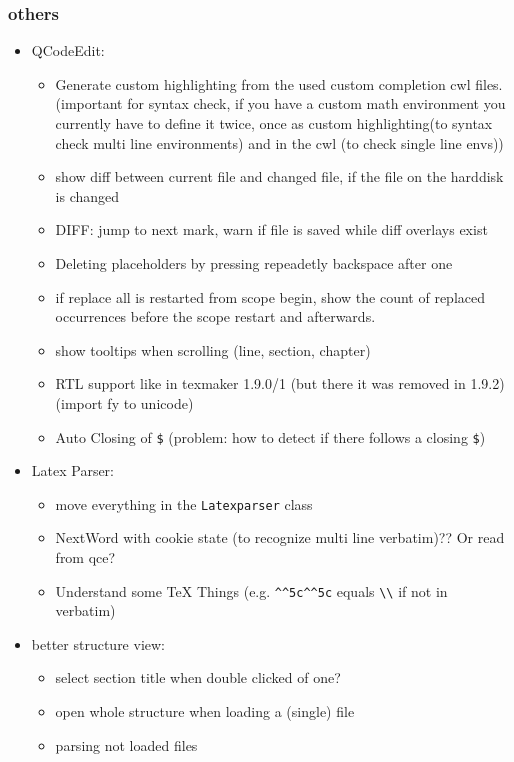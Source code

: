 \documentclass[10pt,a4paper,landscape]{report}
\begin{document}
\subsubsection{others}
\begin{itemize}
	\item QCodeEdit: \begin{itemize}
		\item Generate custom highlighting from the used custom completion cwl files. (important for syntax check, if you have a custom math environment you currently have to define it twice, once as custom highlighting(to syntax check multi line environments) and in the cwl (to check single line envs))
		\item show diff between current file and changed file, if the file on the harddisk is changed
		\item DIFF: jump to next mark, warn if file is saved while diff overlays exist
		\item Deleting placeholders by pressing repeadetly backspace after one
		\item if replace all is restarted from scope begin, show the count of replaced occurrences before the scope restart and afterwards.
		\item show tooltips when scrolling (line, section, chapter)
		\item RTL support like in texmaker 1.9.0/1 (but there it was removed in 1.9.2) (import fy to unicode)
		\item Auto Closing of \verb+$+ (problem: how to detect if there follows a closing \verb+$+)
	\end{itemize}
	\item Latex Parser: \begin{itemize}
		\item move everything in the \verb+Latexparser+ class
		\item NextWord with cookie state (to recognize multi line verbatim)?? Or read from qce?
		\item Understand some TeX Things (e.g. \verb+^^5c^^5c+ equals \verb+\\+ if not in verbatim)
	\end{itemize}
	\item better structure view: \begin{itemize}
		\item select section title when double clicked of one?	
		\item open whole structure when loading a (single)	 file
		\item parsing not loaded files

\end{itemize}
\end{itemize}
\end{document}
